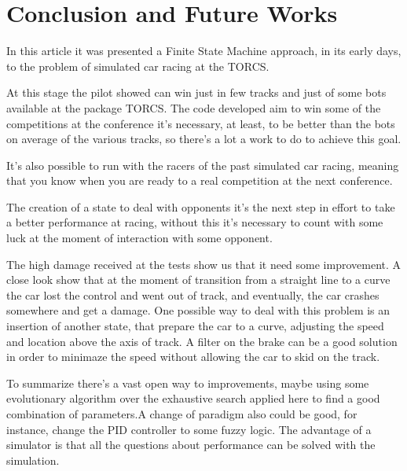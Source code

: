 \section{Conclusion and Future Works}

	In this article it was presented a Finite State Machine approach, in its early days, to the problem of simulated car racing at the TORCS.
	
	At this stage the pilot showed can win just in few tracks and just of some bots available at the package TORCS. The code developed aim to win some of the competitions at the conference it's necessary, at least, to be better than the bots on average of the various tracks, so there's a lot a work to do to achieve this goal. 
	
	It's also possible to run with the racers of the past simulated car racing, meaning that you know when you are ready to a real competition at the next conference.
	
	The creation of a state to deal with opponents it's the next step in effort to take a better performance at racing, without this it's necessary to count with some luck at the moment of interaction with some opponent.
	
	
	The high damage received at the tests show us that it need some improvement. A close look show that at the moment of transition from a straight line to a curve the car lost the control and went out of track, and eventually, the car crashes somewhere and get a damage. One possible way to deal with this problem is an insertion of another state, that prepare the car to a curve, adjusting the speed and location above the axis of track. A filter on the brake can be a good solution in order to minimaze the speed without allowing the car to skid on the track.   
	
	To summarize there's a vast open way to improvements, maybe using some evolutionary algorithm over the exhaustive search applied here to find a good combination of parameters.A change of paradigm also could be good, for instance, change the PID controller to some fuzzy logic. The advantage of a simulator is that all the questions about performance can be solved with the simulation.


